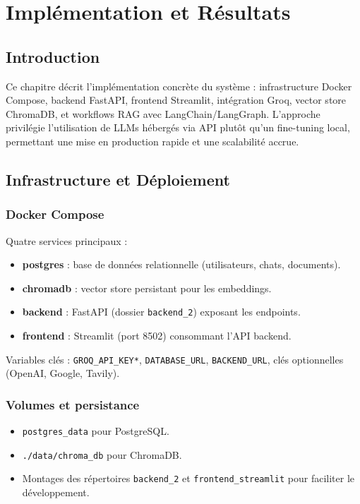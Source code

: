 
\chapter{Implémentation et Résultats}

\section{Introduction}

Ce chapitre décrit l'implémentation concrète du système : infrastructure Docker Compose, backend FastAPI, frontend Streamlit, intégration Groq, vector store ChromaDB, et workflows RAG avec LangChain/LangGraph. L'approche privilégie l'utilisation de LLMs hébergés via API plutôt qu'un fine-tuning local, permettant une mise en production rapide et une scalabilité accrue.

\section{Infrastructure et Déploiement}

\subsection{Docker Compose}
Quatre services principaux :
\begin{itemize}
    \item \textbf{postgres} : base de données relationnelle (utilisateurs, chats, documents).
    \item \textbf{chromadb} : vector store persistant pour les embeddings.
    \item \textbf{backend} : FastAPI (dossier \texttt{backend\_2}) exposant les endpoints.
    \item \textbf{frontend} : Streamlit (port 8502) consommant l'API backend.
\end{itemize}
Variables clés : \texttt{GROQ\_API\_KEY*}, \texttt{DATABASE\_URL}, \texttt{BACKEND\_URL}, clés optionnelles (OpenAI, Google, Tavily).

\subsection{Volumes et persistance}
\begin{itemize}
    \item \texttt{postgres\_data} pour PostgreSQL.
    \item \texttt{./data/chroma\_db} pour ChromaDB.
    \item Montages des répertoires \texttt{backend\_2} et \texttt{frontend\_streamlit} pour faciliter le développement.
\end{itemize}

